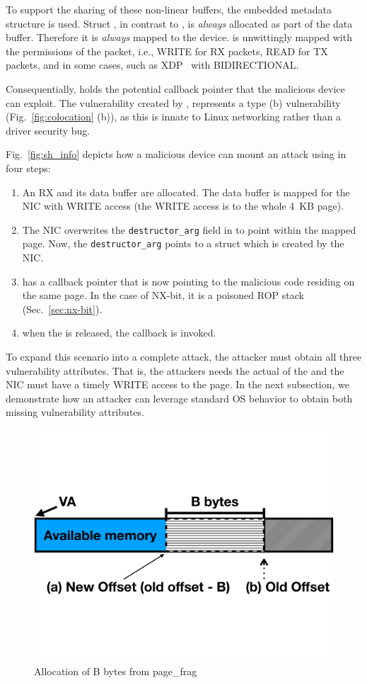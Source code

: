 To support the sharing of these non-linear buffers, the embedded \shinfo{} metadata structure is used.
Struct \shinfo{}, in contrast to \skb{}, is \emph{always} allocated as part of the data buffer. Therefore it is \emph{always} mapped to the device. \shinfo{} is unwittingly mapped with the permissions of the packet, i.e., WRITE for RX packets, READ for TX packets, and in some cases, such as XDP~\cite{xdp} with BIDIRECTIONAL.

Consequentially, \shinfo{} holds the potential callback pointer that the malicious device can exploit. The \subpage{} vulnerability created by \shinfo{}, represents a type (b) vulnerability (Fig.~\ref{fig:colocation} (b)), as this is innate to Linux networking rather than a driver security bug. 

Fig.~\ref{fig:sh_info} depicts how a malicious device can mount an attack using \shinfo{} in four steps:
\begin{enumerate}[label=(\alph*)]
    \item An RX \skb{} and its data buffer are allocated. The data buffer is mapped for the NIC with WRITE access (the WRITE access is to the whole 4~KB page). 
    \item The NIC overwrites the \texttt{destructor\_arg} field in \shinfo{} to point within the mapped page. Now, the \texttt{destructor\_arg} points to a struct \uarg{} which is created by the NIC.
    \item \uarg{} has a callback pointer that is now pointing to the malicious code residing on the same page. In the case of NX-bit, it is a poisoned ROP stack (Sec.~\ref{sec:nx-bit}).
    \item when the \skb{} is released, the callback is invoked.
\end{enumerate}
To expand this scenario into a complete attack, the attacker must obtain all three vulnerability attributes. That is, the attackers needs the actual \kva{} of the \mabaf{} and the NIC must have a timely WRITE access to the page. In the next subsection, we demonstrate how an attacker can leverage standard OS behavior to obtain both missing vulnerability attributes.

\begin{figure}[t]
    \centering
    \includegraphics[width=0.65\linewidth,trim=0 6cm 0 6cm, clip]{figs/page_frag.pdf}
    \caption{Allocation of B bytes from page\_frag}
    \label{fig:page_frags}
\end{figure}

